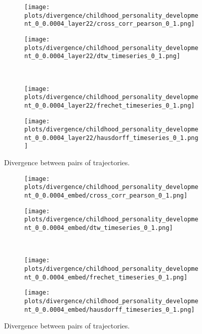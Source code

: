 \documentclass[a4paper,12pt]{article}
\begin{document}
\begin{figure}[H]
    \centering
    \begin{subfigure}[b]{0.48\textwidth}
        \centering
        \texttt{[image: plots/divergence/childhood\_personality\_development\_0\_0.0004\_layer22/cross\_corr\_pearson\_0\_1.png]}
    \end{subfigure}\hfill
    \begin{subfigure}[b]{0.48\textwidth}
        \centering
        \texttt{[image: plots/divergence/childhood\_personality\_development\_0\_0.0004\_layer22/dtw\_timeseries\_0\_1.png]}
    \end{subfigure}
    \\[0.5em]
    \begin{subfigure}[b]{0.48\textwidth}
        \centering
        \texttt{[image: plots/divergence/childhood\_personality\_development\_0\_0.0004\_layer22/frechet\_timeseries\_0\_1.png]}
    \end{subfigure}\hfill
    \begin{subfigure}[b]{0.48\textwidth}
        \centering
        \texttt{[image: plots/divergence/childhood\_personality\_development\_0\_0.0004\_layer22/hausdorff\_timeseries\_0\_1.png]}
    \end{subfigure}
    \caption{Divergence between pairs of trajectories.}
    \label{fig:distance_hidden}
\end{figure}

\begin{figure}[H]
    \centering
    \begin{subfigure}[b]{0.48\textwidth}
        \centering
        \texttt{[image: plots/divergence/childhood\_personality\_development\_0\_0.0004\_embed/cross\_corr\_pearson\_0\_1.png]}
    \end{subfigure}\hfill
    \begin{subfigure}[b]{0.48\textwidth}
        \centering
        \texttt{[image: plots/divergence/childhood\_personality\_development\_0\_0.0004\_embed/dtw\_timeseries\_0\_1.png]}
    \end{subfigure}
    \\[0.5em]
    \begin{subfigure}[b]{0.48\textwidth}
        \centering
        \texttt{[image: plots/divergence/childhood\_personality\_development\_0\_0.0004\_embed/frechet\_timeseries\_0\_1.png]}
    \end{subfigure}\hfill
    \begin{subfigure}[b]{0.48\textwidth}
        \centering
        \texttt{[image: plots/divergence/childhood\_personality\_development\_0\_0.0004\_embed/hausdorff\_timeseries\_0\_1.png]}
    \end{subfigure}
    \caption{Divergence between pairs of trajectories.}
    \label{fig:distance_embed}
\end{figure}
\end{document}
